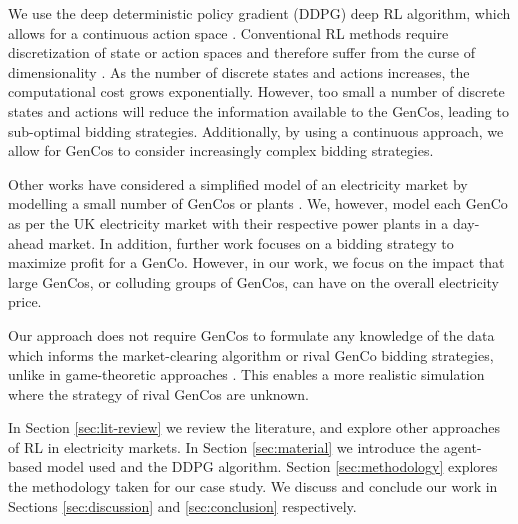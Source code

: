 \documentclass[conference]{IEEEtran}
\begin{document}
We use the deep deterministic policy gradient (DDPG) deep RL algorithm, which allows for a continuous action space \cite{Hunt2016a}. Conventional RL methods require discretization of state or action spaces and therefore suffer from the curse of dimensionality \cite{Ye2020a}. As the number of discrete states and actions increases, the computational cost grows exponentially. However, too small a number of discrete states and actions will reduce the information available to the GenCos, leading to sub-optimal bidding strategies. Additionally, by using a continuous approach, we allow for GenCos to consider increasingly complex bidding strategies. 

Other works have considered a simplified model of an electricity market by modelling a small number of GenCos or plants \cite{EsmaeiliAliabadi2017,Tellidou2007}. We, however, model each GenCo as per the UK electricity market with their respective power plants in a day-ahead market. In addition, further work focuses on a bidding strategy to maximize profit for a GenCo. However, in our work, we focus on the impact that large GenCos, or colluding groups of GenCos, can have on the overall electricity price.


Our approach does not require GenCos to formulate any knowledge of the data which informs the market-clearing algorithm or rival GenCo bidding strategies, unlike in game-theoretic approaches \cite{Wang2011}. This enables a more realistic simulation where the strategy of rival GenCos are unknown.

In Section \ref{sec:lit-review} we review the literature, and explore other approaches of RL in electricity markets. In Section \ref{sec:material} we introduce the agent-based model used and the DDPG algorithm. Section \ref{sec:methodology} explores the methodology taken for our case study. We discuss and conclude our work in Sections \ref{sec:discussion} and \ref{sec:conclusion} respectively. 










\end{document}
